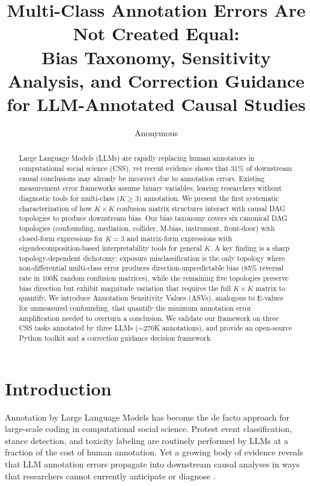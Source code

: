 \documentclass[11pt]{article}
\title{Multi-Class Annotation Errors Are Not Created Equal:\\
Bias Taxonomy, Sensitivity Analysis, and Correction Guidance\\for LLM-Annotated Causal Studies}
\author{Anonymous}
\date{}
\begin{document}
\maketitle

\begin{abstract}
Large Language Models (LLMs) are rapidly replacing human annotators in computational social science (CSS), yet recent evidence shows that 31\% of downstream causal conclusions may already be incorrect due to annotation errors.
Existing measurement error frameworks assume binary variables, leaving researchers without diagnostic tools for multi-class ($K \geq 3$) annotation.
We present the first systematic characterization of how $K \times K$ confusion matrix structures interact with causal DAG topologies to produce downstream bias.
Our bias taxonomy covers six canonical DAG topologies (confounding, mediation, collider, M-bias, instrument, front-door) with closed-form expressions for $K=3$ and matrix-form expressions with eigendecomposition-based interpretability tools for general $K$.
A key finding is a sharp topology-dependent dichotomy: exposure misclassification is the only topology where non-differential multi-class error produces direction-unpredictable bias (85\% reversal rate in 100K random confusion matrices), while the remaining five topologies preserve bias direction but exhibit magnitude variation that requires the full $K \times K$ matrix to quantify.
We introduce Annotation Sensitivity Values (ASVs), analogous to E-values for unmeasured confounding, that quantify the minimum annotation error amplification needed to overturn a conclusion.
We validate our framework on three CSS tasks annotated by three LLMs ($\sim$270K annotations), and provide an open-source Python toolkit and a correction guidance decision framework.
\end{abstract}

\section{Introduction}

Annotation by Large Language Models has become the de facto approach for large-scale coding in computational social science.
Protest event classification, stance detection, and toxicity labeling are routinely performed by LLMs at a fraction of the cost of human annotation.
Yet a growing body of evidence reveals that LLM annotation errors propagate into downstream causal analyses in ways that researchers cannot currently anticipate or diagnose \citep{baumann2025}.
\end{document}
